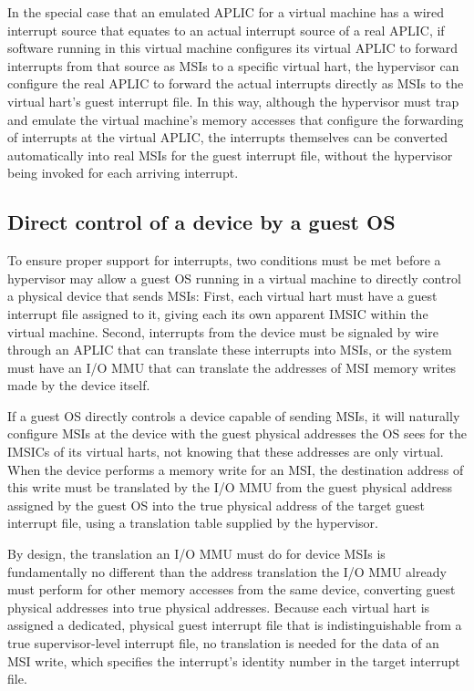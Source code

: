 In the special case that an emulated APLIC for a virtual
machine has a wired interrupt source that equates to an actual
interrupt source of a real APLIC, if software running in this
virtual machine configures its virtual APLIC to forward interrupts from
that source as MSIs to a specific virtual hart, the hypervisor can
configure the real APLIC to forward the actual interrupts directly as
MSIs to the virtual hart's guest interrupt file.
In this way, although the hypervisor must trap and emulate the virtual
machine's memory accesses that configure the forwarding of interrupts
at the virtual APLIC, the interrupts themselves can be converted
automatically into real MSIs for the guest interrupt file, without the
hypervisor being invoked for each arriving interrupt.

\subsection{Direct control of a device by a guest OS}

To ensure proper support for interrupts, two conditions must be met
before a hypervisor may allow a guest OS running in a virtual machine
to directly control a physical device that sends MSIs:
First, each virtual hart must have a guest interrupt file assigned to
it, giving each its own apparent IMSIC within the virtual machine.
Second, interrupts from the device must be signaled by wire through
an APLIC that can translate these interrupts into MSIs, or the
system must have an I/O MMU that can translate the addresses of MSI
memory writes made by the device itself.

If a guest OS directly controls a device capable of sending MSIs, it
will naturally configure MSIs at the device with the guest physical
addresses the OS sees for the IMSICs of its virtual harts, not knowing
that these addresses are only virtual.
When the device performs a memory write for an MSI, the destination
address of this write must be translated by the I/O MMU from the
guest physical address assigned by the guest OS into the true physical
address of the target guest interrupt file, using a translation table
supplied by the hypervisor.

By design, the translation an I/O MMU must do for device MSIs is
fundamentally no different than the address translation the I/O MMU
already must perform for other memory accesses from the same device,
converting guest physical addresses into true physical addresses.
Because each virtual hart is assigned a dedicated, physical guest
interrupt file that is indistinguishable from a true supervisor-level
interrupt file, no translation is needed for the data of an MSI write,
which specifies the interrupt's identity number in the target interrupt
file.

